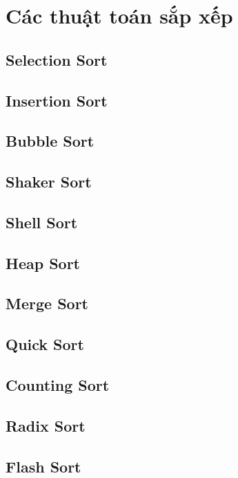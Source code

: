 \section{Các thuật toán sắp xếp}

\subsection{Selection Sort}

\newpage

\subsection{Insertion Sort}

\newpage

\subsection{Bubble Sort}

\newpage

\subsection{Shaker Sort}

\newpage


\subsection{Shell Sort}

\newpage

\subsection{Heap Sort}

\newpage

\subsection{Merge Sort}

\newpage


\subsection{Quick Sort}

\newpage

\subsection{Counting Sort}

\newpage

\subsection{Radix Sort}

\newpage

\subsection{Flash Sort}

\newpage